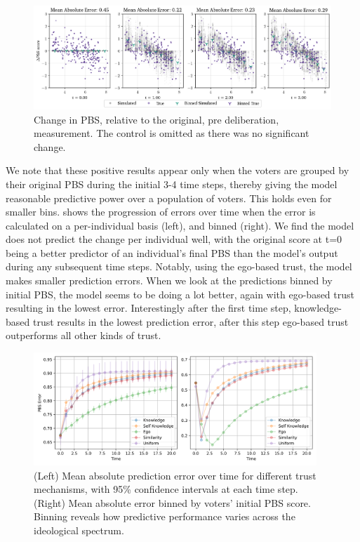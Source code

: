 \documentclass[11pt, oneside, dvipsnames]{Thesis} %
\begin{document}
\begin{figure}[ht]
	\begin{center}
		\includegraphics[width=\textwidth]{Figures/change_pbs_scores.png}
	\end{center}
	\caption{Change in  PBS, relative to the original, pre deliberation, measurement. The control is  omitted as there was no significant change.}\label{fig:delta_pbs}
\end{figure}


We note that these positive results appear only when the voters are grouped by
their original PBS during the initial 3-4 time steps, thereby giving the model
reasonable predictive power over a population of voters.  This holds even for
smaller bins.  shows the progression of errors over
time when the error is calculated on a per-individual basis (left), and binned
(right). We find the model does not predict the change per individual well,
with the original score at t=0 being a better predictor of an individual's final
PBS than the model's output during any subsequent time steps. Notably, using the ego-based trust, the model makes
smaller prediction errors. When we look at the predictions binned by initial
PBS, the model seems to be doing a lot better, again with ego-based trust
resulting in the lowest error. Interestingly after the first time step,
knowledge-based trust results in the lowest prediction error, after this step
ego-based trust outperforms all other kinds of trust.


\begin{figure}[ht]
	\begin{center}
		\includegraphics[width=0.95\textwidth]{Figures/errors_binned.png}
	\end{center}
	\caption{(Left) Mean absolute prediction error over time for different
		trust mechanisms, with 95\% confidence intervals at each time step.
		(Right) Mean absolute error binned by voters' initial PBS score. Binning
		reveals how predictive performance varies across the ideological
		spectrum.}\label{fig:binned_errors}
\end{figure}
\end{document}
